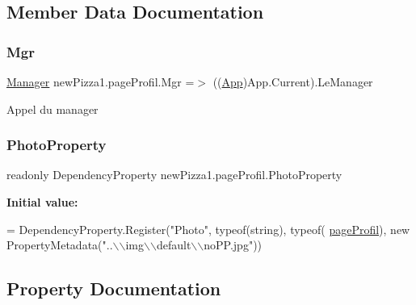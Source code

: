 \subsection{Member Data Documentation}
\mbox{\label{classnewPizza1_1_1pageProfil_af21fd7e24c11b3a1c5ed9f0ca1af2368}} 
\subsubsection{\texorpdfstring{Mgr}{Mgr}}
{\footnotesize\ttfamily \hyperlink{classModele_1_1Manager}{Manager} new\+Pizza1.\+page\+Profil.\+Mgr =$>$ ((\hyperlink{classnewPizza1_1_1App}{App})App.\+Current).Le\+Manager}



Appel du manager 

\mbox{\label{classnewPizza1_1_1pageProfil_a525d9044b16024773ab65eb855057c93}} 
\subsubsection{\texorpdfstring{Photo\+Property}{PhotoProperty}}
{\footnotesize\ttfamily readonly Dependency\+Property new\+Pizza1.\+page\+Profil.\+Photo\+Property\hspace{0.3cm}{\ttfamily [static]}}

{\bfseries Initial value\+:}
\begin{DoxyCode}
=
            DependencyProperty.Register(\textcolor{stringliteral}{"Photo"}, typeof(\textcolor{keywordtype}{string}), typeof(
      \hyperlink{classnewPizza1_1_1pageProfil_a07e57420aca7af196086a365421e0d3c}{pageProfil}), \textcolor{keyword}{new} PropertyMetadata(\textcolor{stringliteral}{"..\(\backslash\)\(\backslash\)img\(\backslash\)\(\backslash\)default\(\backslash\)\(\backslash\)noPP.jpg"}))
\end{DoxyCode}


\subsection{Property Documentation}
\mbox{\label{classnewPizza1_1_1pageProfil_ae10574387cb288277c15a1e317e0747c}} 
